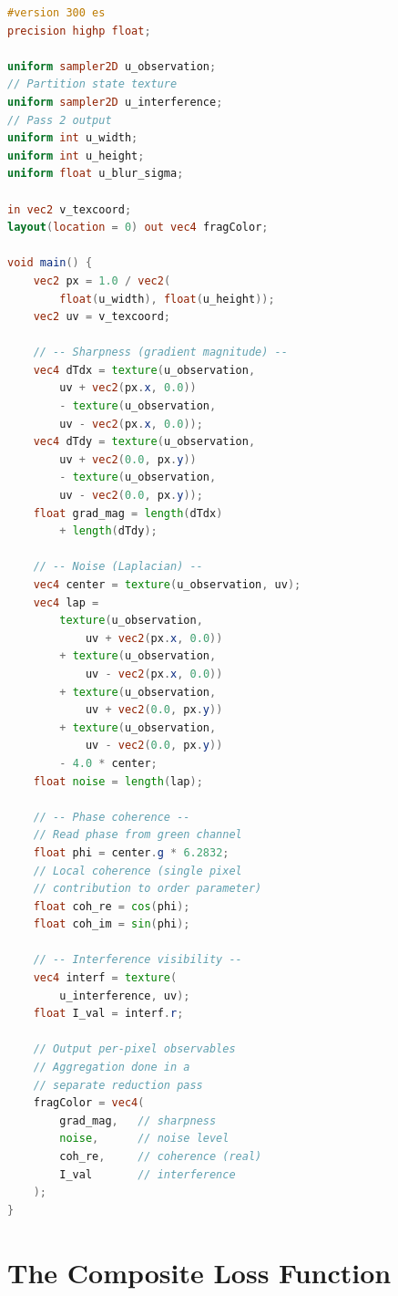 \documentclass[11pt,twocolumn,a4paper]{article}
\theoremstyle{definition}
\theoremstyle{remark}
\begin{document}
\begin{lstlisting}[language=GLSL,caption={Physical Observable Extraction Shader},label=lst:observables]
#version 300 es
precision highp float;

uniform sampler2D u_observation;
// Partition state texture
uniform sampler2D u_interference;
// Pass 2 output
uniform int u_width;
uniform int u_height;
uniform float u_blur_sigma;

in vec2 v_texcoord;
layout(location = 0) out vec4 fragColor;

void main() {
    vec2 px = 1.0 / vec2(
        float(u_width), float(u_height));
    vec2 uv = v_texcoord;

    // -- Sharpness (gradient magnitude) --
    vec4 dTdx = texture(u_observation,
        uv + vec2(px.x, 0.0))
        - texture(u_observation,
        uv - vec2(px.x, 0.0));
    vec4 dTdy = texture(u_observation,
        uv + vec2(0.0, px.y))
        - texture(u_observation,
        uv - vec2(0.0, px.y));
    float grad_mag = length(dTdx)
        + length(dTdy);

    // -- Noise (Laplacian) --
    vec4 center = texture(u_observation, uv);
    vec4 lap =
        texture(u_observation,
            uv + vec2(px.x, 0.0))
        + texture(u_observation,
            uv - vec2(px.x, 0.0))
        + texture(u_observation,
            uv + vec2(0.0, px.y))
        + texture(u_observation,
            uv - vec2(0.0, px.y))
        - 4.0 * center;
    float noise = length(lap);

    // -- Phase coherence --
    // Read phase from green channel
    float phi = center.g * 6.2832;
    // Local coherence (single pixel
    // contribution to order parameter)
    float coh_re = cos(phi);
    float coh_im = sin(phi);

    // -- Interference visibility --
    vec4 interf = texture(
        u_interference, uv);
    float I_val = interf.r;

    // Output per-pixel observables
    // Aggregation done in a
    // separate reduction pass
    fragColor = vec4(
        grad_mag,   // sharpness
        noise,      // noise level
        coh_re,     // coherence (real)
        I_val       // interference
    );
}
\end{lstlisting}


\section{The Composite Loss Function}
\label{sec:loss}
\end{document}
